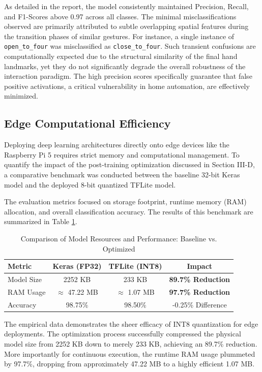 As detailed in the report, the model consistently maintained Precision, Recall, and F1-Scores above 0.97 across all classes. The minimal misclassifications observed are primarily attributed to subtle overlapping spatial features during the transition phases of similar gestures. For instance, a single instance of \texttt{open\_to\_four} was misclassified as \texttt{close\_to\_four}. Such transient confusions are computationally expected due to the structural similarity of the final hand landmarks, yet they do not significantly degrade the overall robustness of the interaction paradigm. The high precision scores specifically guarantee that false positive activations, a critical vulnerability in home automation, are effectively minimized.


\subsection{Edge Computational Efficiency}

Deploying deep learning architectures directly onto edge devices like the Raspberry Pi 5 requires strict memory and computational management. To quantify the impact of the post-training optimization discussed in Section III-D, a comparative benchmark was conducted between the baseline 32-bit Keras model and the deployed 8-bit quantized TFLite model. 

The evaluation metrics focused on storage footprint, runtime memory (RAM) allocation, and overall classification accuracy. The results of this benchmark are summarized in Table \ref{tab:optimization_comparison}.

\begin{table}[htbp]
\caption{Comparison of Model Resources and Performance: Baseline vs. Optimized}
\label{tab:optimization_comparison}
\centering
\begin{tabular}{l c c c}
\hline
\hline 
\textbf{Metric} & \textbf{Keras (FP32)} & \textbf{TFLite (INT8)} & \textbf{Impact} \\
\hline
Model Size & 2252 KB & 233 KB & \textbf{89.7\% Reduction} \\
RAM Usage & $\approx$ 47.22 MB & $\approx$ 1.07 MB & \textbf{97.7\% Reduction} \\
Accuracy & 98.75\% & 98.50\% & -0.25\% Difference \\
\hline
\end{tabular}
\end{table}

The empirical data demonstrates the sheer efficacy of INT8 quantization for edge deployments. The optimization process successfully compressed the physical model size from 2252 KB down to merely 233 KB, achieving an 89.7\% reduction. More importantly for continuous execution, the runtime RAM usage plummeted by 97.7\%, dropping from approximately 47.22 MB to a highly efficient 1.07 MB. 

